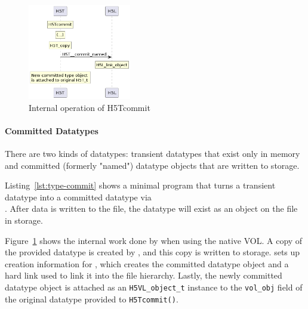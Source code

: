\begin{figure}
\centering
\includegraphics[width=0.4\textwidth]{images/tour_5_uml_datatype_commit.png}
\caption{Internal operation of H5Tcommit}
\label{fig:tour-5-uml-datatype-commit}
\end{figure}

\paragraph{Committed Datatypes} There are two kinds of datatypes: transient datatypes that exist only in memory and committed (formerly "named") datatype objects that are written to storage.

Listing~\ref{lst:type-commit} shows a minimal program that turns a transient datatype into a committed datatype via \\ . After data is written to the file, the datatype will exist as an object on the file in storage.

Figure~\ref{fig:tour-5-uml-datatype-commit} shows the internal work done by  when using the native VOL. A copy of the provided datatype is created by , and this copy is written to storage.  sets up creation information for , which creates the committed datatype object and a hard link used to link it into the file hierarchy. Lastly, the newly committed datatype object is attached as an \texttt{H5VL\_object\_t} instance to the \texttt{vol\_obj} field of the original datatype provided to \texttt{H5Tcommit()}.

